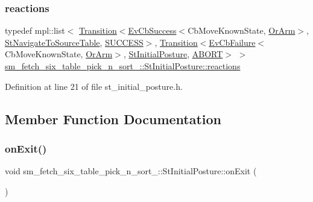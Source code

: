 \subsubsection{\texorpdfstring{reactions}{reactions}}
{\footnotesize\ttfamily typedef mpl\+::list$<$ \hyperlink{classsmacc_1_1Transition}{Transition}$<$\hyperlink{structsmacc_1_1EvCbSuccess}{Ev\+Cb\+Success}$<$Cb\+Move\+Known\+State, \hyperlink{classsm__fetch__six__table__pick__n__sort__1_1_1OrArm}{Or\+Arm}$>$, \hyperlink{structsm__fetch__six__table__pick__n__sort__1_1_1StNavigateToSourceTable}{St\+Navigate\+To\+Source\+Table}, \hyperlink{structsmacc_1_1default__transition__tags_1_1SUCCESS}{S\+U\+C\+C\+E\+SS}$>$, \hyperlink{classsmacc_1_1Transition}{Transition}$<$\hyperlink{structsmacc_1_1EvCbFailure}{Ev\+Cb\+Failure}$<$Cb\+Move\+Known\+State, \hyperlink{classsm__fetch__six__table__pick__n__sort__1_1_1OrArm}{Or\+Arm}$>$, \hyperlink{structsm__fetch__six__table__pick__n__sort__1_1_1StInitialPosture}{St\+Initial\+Posture}, \hyperlink{structsmacc_1_1default__transition__tags_1_1ABORT}{A\+B\+O\+RT}$>$ $>$ \hyperlink{structsm__fetch__six__table__pick__n__sort__1_1_1StInitialPosture_a5b37238100acae9e9da76c09cf50fab6}{sm\+\_\+fetch\+\_\+six\+\_\+table\+\_\+pick\+\_\+n\+\_\+sort\+\_\+::\+St\+Initial\+Posture\+::reactions}}



Definition at line 21 of file st\+\_\+initial\+\_\+posture.\+h.



\subsection{Member Function Documentation}
\mbox{\label{structsm__fetch__six__table__pick__n__sort__1_1_1StInitialPosture_ad6588f17a6cd12fcd539227fca5c9d27}} 
\subsubsection{\texorpdfstring{on\+Exit()}{onExit()}\hspace{0.1cm}{\footnotesize\ttfamily [1/3]}}
{\footnotesize\ttfamily void sm\+\_\+fetch\+\_\+six\+\_\+table\+\_\+pick\+\_\+n\+\_\+sort\+\_\+::\+St\+Initial\+Posture\+::on\+Exit (\begin{DoxyParamCaption}\item[{\hyperlink{structsmacc_1_1default__transition__tags_1_1SUCCESS}{S\+U\+C\+C\+E\+SS}}]{ }\end{DoxyParamCaption})\hspace{0.3cm}{\ttfamily [inline]}}



